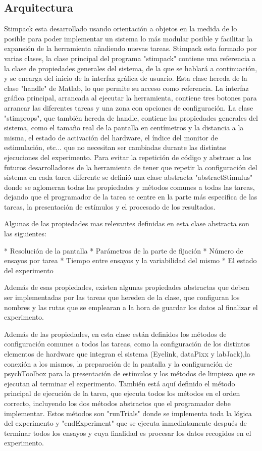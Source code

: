 \documentclass[conference]{IEEEtran}
\begin{document}
\subsection{Arquitectura}
Stimpack esta desarrollado usando orientación a objetos en la medida de lo posible para poder implementar un sistema lo más modular posible y facilitar la expansión de la herramienta añadiendo nuevas tareas.
Stimpack esta formado por varias clases, la clase principal del programa "stimpack" contiene una referencia a la clase de propiedades generales del sistema, de la que se hablará a continuación, y se encarga del inicio de la interfaz gráfica de usuario. Esta clase hereda de la clase "handle" de Matlab, lo que permite su acceso como referencia. La interfaz gráfica principal, arrancada al ejecutar la herramienta, contiene tres botones para arrancar las diferentes tareas y una zona con opciones de configuración.
La clase "stimprops", que también hereda de handle, contiene las propiedades generales del sistema, como el tamaño real de la pantalla en centímetros y la distancia a la misma, el estado de activación del hardware, el índice del monitor de estimulación, etc... que no necesitan ser cambiadas durante las distintas ejecuciones del experimento.
Para evitar la repetición de código y abstraer a los futuros desarrolladores de la herramienta de tener que repetir la configuración del sistema en cada tarea diferente se definió una clase abstracta "abstractStimulus" donde se aglomeran todas las propiedades y métodos comunes a todas las tareas, dejando que el  programador de la tarea se centre en la parte más especifica de las tareas, la presentación de estímulos y el procesado de los resultados.

Algunas de las propiedades mas relevantes definidas en esta clase abstracta son las siguientes:

* Resolución de la pantalla
* Parámetros de la parte de fijación
* Número de ensayos por tarea
* Tiempo entre ensayos y la variabilidad del mismo
* El estado del experimento

Además de esas propiedades, existen algunas propiedades abstractas que deben ser implementadas por las tareas que hereden de la clase, que configuran los nombres y las rutas que se emplearan a la hora de guardar los datos al finalizar el experimento.

Además de las propiedades, en esta clase están definidos los métodos de configuración comunes a todos las tareas, como la configuración de los distintos elementos de hardware que integran el sistema (Eyelink, dataPixx y labJack),la conexión a los mismos, la preparación de la pantalla y la configuración de psychToolbox para la presentación de estímulos y los métodos de limpieza que se ejecutan al terminar el experimento. También está aquí definido el método principal de ejecución de la tarea, que ejecuta todos los métodos en el orden correcto, incluyendo los dos métodos abstractos que el programador debe implementar. Estos métodos son "runTrials" donde se implementa toda la lógica del experimento y "endExperiment" que se ejecuta inmediatamente después de terminar todos los ensayos y cuya finalidad es procesar los datos recogidos en el experimento.
\end{document}

